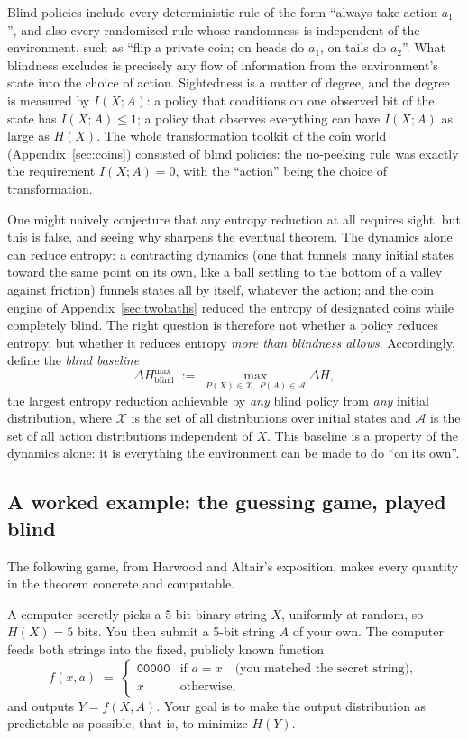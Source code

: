 \documentclass[10pt]{article}
\theoremstyle{definition}
\theoremstyle{remark}
\begin{document}
Blind policies include every deterministic rule of the form ``always take action $a_1$'', and also every randomized rule whose randomness is independent of the environment, such as ``flip a private coin; on heads do $a_1$, on tails do $a_2$''. What blindness excludes is precisely any flow of information from the environment's state into the choice of action. Sightedness is a matter of degree, and the degree is measured by $I(X;A)$: a policy that conditions on one observed bit of the state has $I(X;A) \le 1$; a policy that observes everything can have $I(X;A)$ as large as $H(X)$. The whole transformation toolkit of the coin world (Appendix~\ref{sec:coins}) consisted of blind policies: the no-peeking rule was exactly the requirement $I(X;A) = 0$, with the ``action'' being the choice of transformation.

One might naively conjecture that any entropy reduction at all requires sight, but this is false, and seeing why sharpens the eventual theorem. The dynamics alone can reduce entropy: a contracting dynamics (one that funnels many initial states toward the same point on its own, like a ball settling to the bottom of a valley against friction) funnels states all by itself, whatever the action; and the coin engine of Appendix~\ref{sec:twobaths} reduced the entropy of designated coins while completely blind. The right question is therefore not whether a policy reduces entropy, but whether it reduces entropy \emph{more than blindness allows}. Accordingly, define the \emph{blind baseline}
\[
\Delta H^{\max}_{\text{blind}} \;:=\; \max_{P(X) \in \mathcal{X},\; P(A) \in \mathcal{A}} \Delta H,
\]
the largest entropy reduction achievable by \emph{any} blind policy from \emph{any} initial distribution, where $\mathcal{X}$ is the set of all distributions over initial states and $\mathcal{A}$ is the set of all action distributions independent of $X$. This baseline is a property of the dynamics alone: it is everything the environment can be made to do ``on its own''.

\subsection{A worked example: the guessing game, played blind}
\label{sec:gameblind}

The following game, from Harwood and Altair's exposition, makes every quantity in the theorem concrete and computable.

A computer secretly picks a 5-bit binary string $X$, uniformly at random, so $H(X) = 5$ bits. You then submit a 5-bit string $A$ of your own. The computer feeds both strings into the fixed, publicly known function
\[
f(x, a) \;=\;
\begin{cases}
\texttt{00000} & \text{if } a = x \quad \text{(you matched the secret string)},\\[2pt]
x & \text{otherwise},
\end{cases}
\]
and outputs $Y = f(X, A)$. Your goal is to make the output distribution as predictable as possible, that is, to minimize $H(Y)$.
\end{document}
